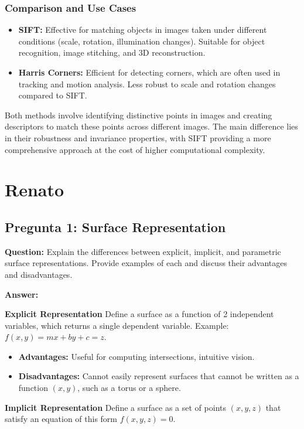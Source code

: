 \documentclass{article}
\begin{document}
\subsubsection{Comparison and Use Cases}
\begin{itemize}
    \item \textbf{SIFT:} Effective for matching objects in images taken under different conditions (scale, rotation, illumination changes). Suitable for object recognition, image stitching, and 3D reconstruction.
    \item \textbf{Harris Corners:} Efficient for detecting corners, which are often used in tracking and motion analysis. Less robust to scale and rotation changes compared to SIFT.
\end{itemize}

Both methods involve identifying distinctive points in images and creating descriptors to match these points across different images. The main difference lies in their robustness and invariance properties, with SIFT providing a more comprehensive approach at the cost of higher computational complexity.


\section{Renato}

\subsection{Pregunta 1: Surface Representation}

\textbf{Question:} Explain the differences between explicit, implicit, and parametric surface representations. Provide examples of each and discuss their advantages and disadvantages.

\textbf{Answer:}

\textbf{Explicit Representation} Define a surface as a function of 2 independent variables, which returns a single dependent variable. Example: $f(x, y) = mx + by + c = z$.

\begin{itemize}
    \item \textbf{Advantages:} Useful for computing intersections, intuitive vision.
    \item \textbf{Disadvantages:} Cannot easily represent surfaces that cannot be written as a function $(x, y)$, such as a torus or a sphere.
\end{itemize}

\textbf{Implicit Representation} Define a surface as a set of points $(x, y, z)$ that satisfy an equation of this form $f(x, y, z) = 0$.
\end{document}
